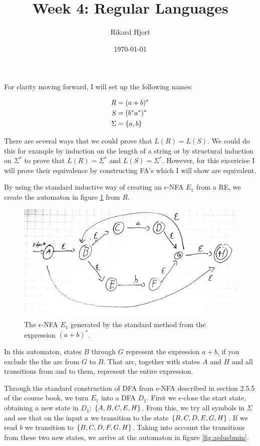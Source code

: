 \documentclass{article}
\title{Week 4: Regular Languages}
\date{\today}
\author{Rikard Hjort}
\begin{document}
\maketitle

\section{}

For clarity moving forward, I will set up the following names:

\begin{align*}
    R &= (a+b)^* \\
    S &= (b^*a^*)^* \\
    \Sigma &= \set{a,b}
\end{align*}

There are several ways that we could prove that $L(R)=L(S)$. We could do this for example by induction on the length of a string or by structural induction on $\Sigma^*$ to prove that $L(R) = \Sigma^*$ and $L(S) = \Sigma^*$. However, for this excericise I will prove their equivalence by constructing FA's which I will show are equivalent.

By using the standard inductive way of creating an $\epsilon$-NFA $E_1$ from a RE, we create the automaton in figure \ref{fig:aplusb} from $R$.

\begin{figure}[htpb]
    \centering
    \includegraphics[width=0.8\linewidth]{aplusb}
    \caption{The $\epsilon$-NFA $E_1$ generated by the standard method from the expression $(a+b)^*$.}
    \label{fig:aplusb}
\end{figure}

In this automaton, states $B$ through $G$ represent the expression $a+b$, if you exclude the the arc from $G$ to $B$. That arc, together with states $A$ and $H$ and all transitions from and to them, represent the entire expression.

Through the standard construction of DFA from $\epsilon$-NFA described in section 2.5.5 of the course book, we turn $E_1$ into a DFA $D_1$. First we $\epsilon$-close the start state, obtaining a new state in $D_1$: $\set{A,B,C,E,H}$. From this, we try all symbols in $\Sigma$ and see that on the input $a$ we transition to the state $\set{B,C,D,E,G,H}$. If we read $b$ we transition to $\set{B,C,D,F,G,H}$. Taking into account the transitions from these two new states, we arrive at the automaton in figure \ref{fig:aplusbmin}.
\end{document}
